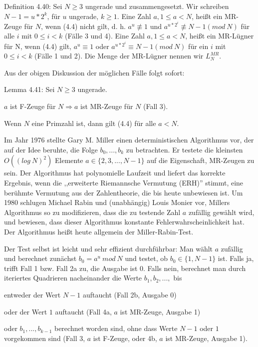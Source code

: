 \documentclass[a4paper]{article}
\begin{document}
\begin{multicols}{3}
        Definition 4.40: Sei $N\geq 3$ ungerade und zusammengesetzt. Wir schreiben $N-1=u*2^k$, für $u$ ungerade, $k\geq 1$. Eine Zahl $a, 1\leq a < N$, heißt ein MR-Zeuge für $N$, wenn (4.4) nicht gilt, d. h. $a^u\not\equiv 1$ und $a^{u*2^i}\not\equiv N-1 (mod\ N)$ für alle $i$ mit $0\leq i < k$ (Fälle 3 und 4). Eine Zahl $a, 1\leq a < N$, heißt ein MR-Lügner für N, wenn (4.4) gilt, $a^u\equiv 1$ oder $a^{u*2^i}\equiv N-1 (mod\ N)$ für ein $i$ mit $0\leq i < k$ (Fälle 1 und 2). Die Menge der MR-Lügner nennen wir $L^{MR}_N$.

        Aus der obigen Diskussion der möglichen Fälle folgt sofort:

        Lemma 4.41: Sei $N\geq 3$ ungerade.
        \begin{enumerate*}
            \item $a$ ist F-Zeuge für $N \Rightarrow a$ ist MR-Zeuge für $N$ (Fall 3).
            \item Wenn $N$ eine Primzahl ist, dann gilt (4.4) für alle $a<N$.
        \end{enumerate*}

        Im Jahr 1976 stellte Gary M. Miller einen deterministischen Algorithmus vor, der auf der Idee beruhte, die Folge $b_0,...,b_k$ zu betrachten. Er testete die kleinsten $O((log\ N)^2)$ Elemente $a\in\{2,3,...,N-1\}$ auf die Eigenschaft, MR-Zeugen zu sein. Der Algorithmus hat polynomielle Laufzeit und liefert das korrekte Ergebnis, wenn die ,,erweiterte Riemannsche Vermutung (ERH)'' stimmt, eine berühmte Vermutung aus der Zahlentheorie, die bis heute unbewiesen ist. Um 1980 schlugen Michael Rabin und (unabhängig) Louis Monier vor, Millers Algorithmus so zu modifizieren, dass die zu testende Zahl $a$ zufällig gewählt wird, und bewiesen, dass dieser Algorithmus konstante Fehlerwahrscheinlichkeit hat. Der Algorithmus heißt heute allgemein der Miller-Rabin-Test.

        Der Test selbst ist leicht und sehr effizient durchführbar: Man wählt $a$ zufällig und berechnet zunächst $b_0=a^u\ mod\ N$ und testet, ob $b_0\in\{1,N-1\}$ ist. Falls ja, trifft Fall 1 bzw. Fall 2a zu, die Ausgabe ist $0$. Falls nein, berechnet man durch iteriertes Quadrieren nacheinander die Werte $b_1,b_2,...,$ bis
        \begin{itemize*}
            \item entweder der Wert $N-1$ auftaucht (Fall 2b, Ausgabe 0)
            \item oder der Wert $1$ auftaucht (Fall 4a, $a$ ist MR-Zeuge, Ausgabe 1)
            \item oder $b_1,...,b_{k-1}$ berechnet worden sind, ohne dass Werte $N-1$ oder $1$ vorgekommen sind (Fall 3, $a$ ist F-Zeuge, oder 4b, $a$ ist MR-Zeuge, Ausgabe 1).
        \end{itemize*}


\end{multicols}
\end{document}
